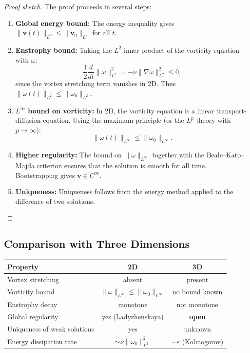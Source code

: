 \begin{proof}[Proof sketch]
The proof proceeds in several steps:
\begin{enumerate}
\item \textbf{Global energy bound:} The energy inequality gives $\|\mathbf{v}(t)\|_{L^2} \le \|\mathbf{v}_0\|_{L^2}$ for all $t$.

\item \textbf{Enstrophy bound:} Taking the $L^2$ inner product of the vorticity equation with $\omega$:
\[
\frac{1}{2}\frac{d}{dt}\|\omega\|_{L^2}^2 = -\nu \|\nabla \omega\|_{L^2}^2 \le 0,
\]
since the vortex stretching term vanishes in 2D. Thus $\|\omega(t)\|_{L^2} \le \|\omega_0\|_{L^2}$.

\item \textbf{$L^\infty$ bound on vorticity:} In 2D, the vorticity equation is a linear transport-diffusion equation. Using the maximum principle (or the $L^p$ theory with $p \to \infty$):
\[
\|\omega(t)\|_{L^\infty} \le \|\omega_0\|_{L^\infty}.
\]

\item \textbf{Higher regularity:} The bound on $\|\omega\|_{L^\infty}$ together with the Beale--Kato--Majda criterion ensures that the solution is smooth for all time. Bootstrapping gives $\mathbf{v} \in C^\infty$.

\item \textbf{Uniqueness:} Uniqueness follows from the energy method applied to the difference of two solutions.
\end{enumerate}
\end{proof}

\subsection{Comparison with Three Dimensions}

\begin{center}
\begin{tabular}{lcc}
\hline
\textbf{Property} & \textbf{2D} & \textbf{3D} \\
\hline
Vortex stretching & absent & present \\
Vorticity bound & $\|\omega\|_{L^\infty} \le \|\omega_0\|_{L^\infty}$ & no bound known \\
Enstrophy decay & monotone & not monotone \\
Global regularity & yes (Ladyzhenskaya) & \textbf{open} \\
Uniqueness of weak solutions & yes & unknown \\
Energy dissipation rate & $\sim \nu \|\omega_0\|_{L^2}^2$ & $\sim \varepsilon$ (Kolmogorov) \\
\hline
\end{tabular}
\end{center}

